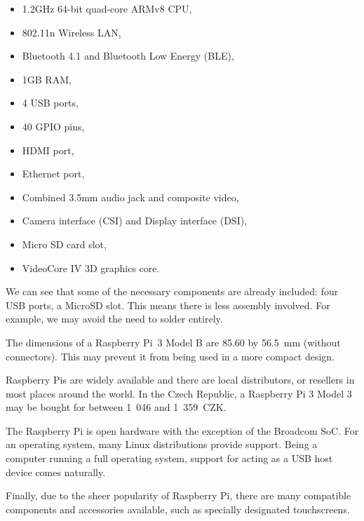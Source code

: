            \begin{itemize}
                \item 1.2GHz 64-bit quad-core ARMv8 CPU,
                \item 802.11n Wireless LAN,
                \item Bluetooth 4.1 and Bluetooth Low Energy (BLE),
                \item 1GB RAM,
                \item 4 USB ports,
                \item 40 GPIO pins,
                \item HDMI port,
                \item Ethernet port,
                \item Combined 3.5mm audio jack and composite video,
                \item Camera interface (CSI) and Display interface (DSI),
                \item Micro SD card slot,
                \item VideoCore IV 3D graphics core.
            \end{itemize}
            
            We can see that some of the necessary components are already included: four USB ports, a MicroSD slot.  This means there is less assembly involved.  For example, we may avoid the need to solder entirely.
            
            The dimensions of a Raspberry Pi~3 Model B are 85.60 by 56.5~mm (without connectors).  This may prevent it from being used in a more compact design.
            
            Raspberry Pis are widely available and there are local distributors, or resellers in most places around the world\cite{rpi-buying-guide}\cite{rpi-buying-links-by-country}.  In the Czech Republic, a Raspberry Pi 3 Model 3 may be bought for between 1~046 and 1~359~CZK\cite{rpi-rpi3-rpishop}\cite{rpi-rpi3-minidroid}\cite{rpi-rpi3-alza}.
            
            The Raspberry Pi is open hardware with the exception of the Broadcom SoC.  For an operating system, many Linux distributions provide support\cite{rpi-opensource}.  Being a computer running a full operating system, support for acting as a USB host device comes naturally.
            
            Finally, due to the sheer popularity of Raspberry Pi, there are many compatible components and accessories available\cite{rpi-rs-components}\cite{rpi-the-pi-hut-store}, such as specially designated touchscreens\cite{rpi-official-touchscreen}.
            
